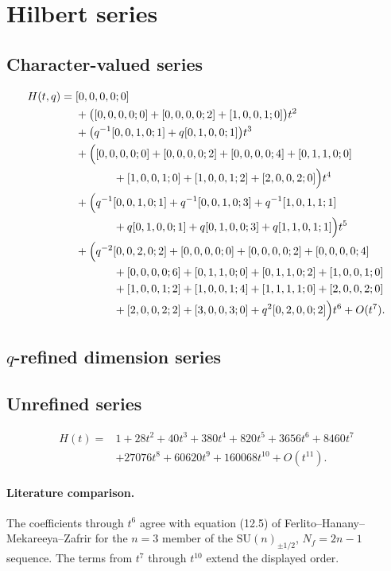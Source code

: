 \documentclass[11pt]{article}
\begin{document}
\section{Hilbert series}
\subsection{Character-valued series}
\begin{align*}
H(t,q)={}&[0,0,0,0;0]\\
&+\bigl([0,0,0,0;0]+[0,0,0,0;2]+[1,0,0,1;0]\bigr)t^2\\
&+\bigl(q^{-1}[0,0,1,0;1]+q[0,1,0,0;1]\bigr)t^3\\
&+\Bigl([0,0,0,0;0]+[0,0,0,0;2]+[0,0,0,0;4]
+[0,1,1,0;0]\\
&\hspace{1.2cm}+[1,0,0,1;0]+[1,0,0,1;2]+[2,0,0,2;0]\Bigr)t^4\\
&+\Bigl(q^{-1}[0,0,1,0;1]+q^{-1}[0,0,1,0;3]
+q^{-1}[1,0,1,1;1]\\
&\hspace{1.2cm}+q[0,1,0,0;1]+q[0,1,0,0;3]
+q[1,1,0,1;1]\Bigr)t^5\\
&+\Bigl(q^{-2}[0,0,2,0;2]+[0,0,0,0;0]+[0,0,0,0;2]
+[0,0,0,0;4]\\
&\hspace{1.2cm}+[0,0,0,0;6]+[0,1,1,0;0]+[0,1,1,0;2]
+[1,0,0,1;0]\\
&\hspace{1.2cm}+[1,0,0,1;2]+[1,0,0,1;4]+[1,1,1,1;0]
+[2,0,0,2;0]\\
&\hspace{1.2cm}+[2,0,0,2;2]+[3,0,0,3;0]+q^2[0,2,0,0;2]\Bigr)t^6
+O(t^7).
\end{align*}

\subsection{$q$-refined dimension series}


\subsection{Unrefined series}
\begin{align}
H(t)={}&1+28t^2+40t^3+380t^4+820t^5+3656t^6+8460t^7
\nonumber\\
&+27076t^8+60620t^9+160068t^{10}+O(t^{11}).
\label{eq:unrefined-hs}
\end{align}

\paragraph{Literature comparison.}
The coefficients through $t^6$ agree with equation (12.5) of Ferlito--Hanany--Mekareeya--Zafrir for the $n=3$ member of the $\mathrm{SU}(n)_{\pm1/2}$, $N_f=2n-1$ sequence.  The terms from $t^7$ through $t^{10}$ extend the displayed order.
\end{document}
